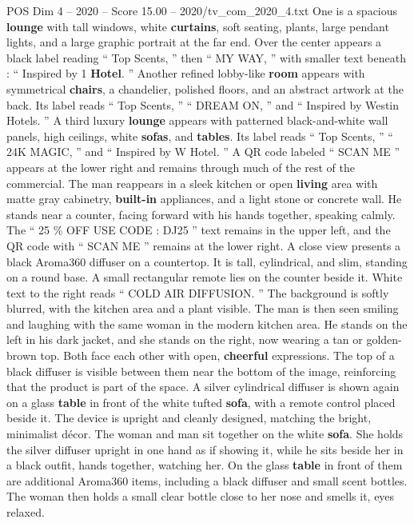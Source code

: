 \begin{textsample}{POS Dim 4 – 2020 – Score 15.00 – 2020/tv\_com\_2020\_4.txt}
One is a spacious \textbf{lounge} with tall windows, white \textbf{curtains}, soft seating, plants, large pendant lights, and a large graphic portrait at the far end.
Over the center appears a black label reading “ Top Scents, ” then “ MY WAY, ” with smaller text beneath : “ Inspired by 1 \textbf{Hotel}. ” Another refined lobby-like \textbf{room} appears with symmetrical \textbf{chairs}, a chandelier, polished floors, and an abstract artwork at the back.
Its label reads “ Top Scents, ” “ DREAM ON, ” and “ Inspired by Westin Hotels. ” A third luxury \textbf{lounge} appears with patterned black-and-white wall panels, high ceilings, white \textbf{sofas}, and \textbf{tables}.
Its label reads “ Top Scents, ” “ 24K MAGIC, ” and “ Inspired by W Hotel. ” A QR code labeled “ SCAN ME ” appears at the lower right and remains through much of the rest of the commercial.
The man reappears in a sleek kitchen or open \textbf{living} area with matte gray cabinetry, \textbf{built-in} appliances, and a light stone or concrete wall.
He stands near a counter, facing forward with his hands together, speaking calmly.
The “ 25 \% OFF USE CODE : DJ25 ” text remains in the upper left, and the QR code with “ SCAN ME ” remains at the lower right.
A close view presents a black Aroma360 diffuser on a countertop.
It is tall, cylindrical, and slim, standing on a round base.
A small rectangular remote lies on the counter beside it.
White text to the right reads “ COLD AIR DIFFUSION. ” The background is softly blurred, with the kitchen area and a plant visible.
The man is then seen smiling and laughing with the same woman in the modern kitchen area.
He stands on the left in his dark jacket, and she stands on the right, now wearing a tan or golden-brown top.
Both face each other with open, \textbf{cheerful} expressions.
The top of a black diffuser is visible between them near the bottom of the image, reinforcing that the product is part of the space.
A silver cylindrical diffuser is shown again on a glass \textbf{table} in front of the white tufted \textbf{sofa}, with a remote control placed beside it.
The device is upright and cleanly designed, matching the bright, minimalist décor.
The woman and man sit together on the white \textbf{sofa}.
She holds the silver diffuser upright in one hand as if showing it, while he sits beside her in a black outfit, hands together, watching her.
On the glass \textbf{table} in front of them are additional Aroma360 items, including a black diffuser and small scent bottles.
The woman then holds a small clear bottle close to her nose and smells it, eyes relaxed.

\end{textsample}
